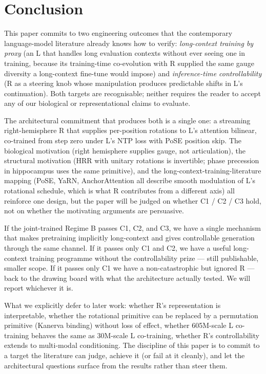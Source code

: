 \documentclass[10pt, twocolumn, a4paper]{article}
\begin{document}
\section{Conclusion}
\label{sec:conclusion}

This paper commits to two engineering outcomes that the contemporary language-model literature already knows how to verify: \emph{long-context training by proxy} (an L that handles long evaluation contexts without ever seeing one in training, because its training-time co-evolution with R supplied the same gauge diversity a long-context fine-tune would impose) and \emph{inference-time controllability} (R as a steering knob whose manipulation produces predictable shifts in L's continuation). Both targets are recognisable; neither requires the reader to accept any of our biological or representational claims to evaluate.

The architectural commitment that produces both is a single one: a streaming right-hemisphere R that supplies per-position rotations to L's attention bilinear, co-trained from step zero under L's NTP loss with PoSE position skip. The biological motivation (right hemisphere supplies gauge, not articulation), the structural motivation (HRR with unitary rotations is invertible; phase precession in hippocampus uses the same primitive), and the long-context-training-literature mapping (PoSE, YaRN, AnchorAttention all describe smooth modulation of L's rotational schedule, which is what R contributes from a different axis) all reinforce one design, but the paper will be judged on whether C1 / C2 / C3 hold, not on whether the motivating arguments are persuasive.

If the joint-trained Regime B passes C1, C2, and C3, we have a single mechanism that makes pretraining implicitly long-context and gives controllable generation through the same channel. If it passes only C1 and C2, we have a useful long-context training programme without the controllability prize --- still publishable, smaller scope. If it passes only C1 we have a non-catastrophic but ignored R --- back to the drawing board with what the architecture actually tested. We will report whichever it is.

What we explicitly defer to later work: whether R's representation is interpretable, whether the rotational primitive can be replaced by a permutation primitive (Kanerva binding) without loss of effect, whether 605M-scale L co-training behaves the same as 30M-scale L co-training, whether R's controllability extends to multi-modal conditioning. The discipline of this paper is to commit to a target the literature can judge, achieve it (or fail at it cleanly), and let the architectural questions surface from the results rather than steer them.
\end{document}
